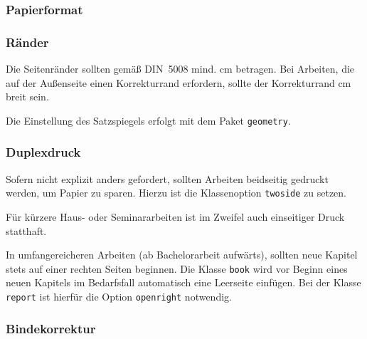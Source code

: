 
\subsubsection{Papierformat}


\subsubsection{Ränder}

Die Seitenränder sollten gemäß DIN~5008 mind. \unit[2,5]{cm} betragen. Bei
Arbeiten, die auf der Außenseite einen Korrekturrand erfordern, sollte der
Korrekturrand \unit[5]{cm} breit sein.

Die Einstellung des Satzspiegels erfolgt mit dem Paket \texttt{geometry}.

\newpage
{}
\printheadingsfalse
\printparametersfalse
\currentpage
\begin{minipage}{0.5\linewidth}
\oddpagelayoutfalse
\pagedesign
\end{minipage}%
\begin{minipage}{0.5\linewidth}
\oddpagelayouttrue
\pagedesign
\end{minipage}


\subsubsection{Duplexdruck}

Sofern nicht explizit anders gefordert, sollten Arbeiten beidseitig gedruckt
werden, um Papier zu sparen. Hierzu ist die Klassenoption \texttt{twoside} zu
setzen.


Für kürzere Haus- oder Seminararbeiten ist im Zweifel auch einseitiger Druck
statthaft.

In umfangereicheren Arbeiten (ab Bachelorarbeit aufwärts), sollten neue
Kapitel stets auf einer rechten Seiten beginnen. Die Klasse \texttt{book} wird
vor Beginn eines neuen Kapitels im Bedarfsfall automatisch eine Leerseite
einfügen. Bei der Klasse \texttt{report} ist hierfür die Option
\texttt{openright} notwendig.





\subsubsection{Bindekorrektur}

